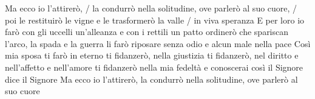 \beginchorus
Ma ecco io l'attirerò, / la condurrò nella solitudine,
ove parlerò al suo cuore, / poi le restituirò le vigne
e le trasformerò la valle / in viva speranza
\endchorus
\beginverse
E per loro io farò
con gli uccelli un'alleanza
e con i rettili un patto
ordinerò che spariscan
l'arco, la spada e la guerra
li farò riposare
senza odio e alcun male nella pace
Così mia sposa ti farò
in eterno ti fidanzerò,
nella giustizia ti fidanzerò,
nel diritto e nell'affetto
e nell'amore ti fidanzerò
nella mia fedeltà
e conoscerai così il Signore
dice il Signore
\endverse
\beginchorus
Ma ecco io l'attirerò,
la condurrò nella solitudine,
ove parlerò al suo cuore
\endchorus
\endsong
